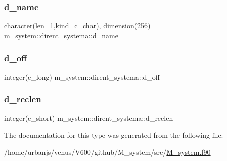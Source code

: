 \subsubsection{\texorpdfstring{d\+\_\+name}{d\_name}}
{\footnotesize\ttfamily character(len=1,kind=c\+\_\+char), dimension(256) m\+\_\+system\+::dirent\+\_\+systema\+::d\+\_\+name\hspace{0.3cm}{\ttfamily [private]}}

\mbox{\label{structm__system_1_1dirent__systema_a4f317f4bd63c3aeca25f5f6df681a7d3}} 
\subsubsection{\texorpdfstring{d\+\_\+off}{d\_off}}
{\footnotesize\ttfamily integer(c\+\_\+long) m\+\_\+system\+::dirent\+\_\+systema\+::d\+\_\+off\hspace{0.3cm}{\ttfamily [private]}}

\mbox{\label{structm__system_1_1dirent__systema_a74c3e2cb9fd26444b7c7837d4ce69baf}} 
\subsubsection{\texorpdfstring{d\+\_\+reclen}{d\_reclen}}
{\footnotesize\ttfamily integer(c\+\_\+short) m\+\_\+system\+::dirent\+\_\+systema\+::d\+\_\+reclen\hspace{0.3cm}{\ttfamily [private]}}



The documentation for this type was generated from the following file\+:\begin{DoxyCompactItemize}
\item 
/home/urbanjs/venus/\+V600/github/\+M\+\_\+system/src/\mbox{\hyperlink{M__system_8f90}{M\+\_\+system.\+f90}}\end{DoxyCompactItemize}
